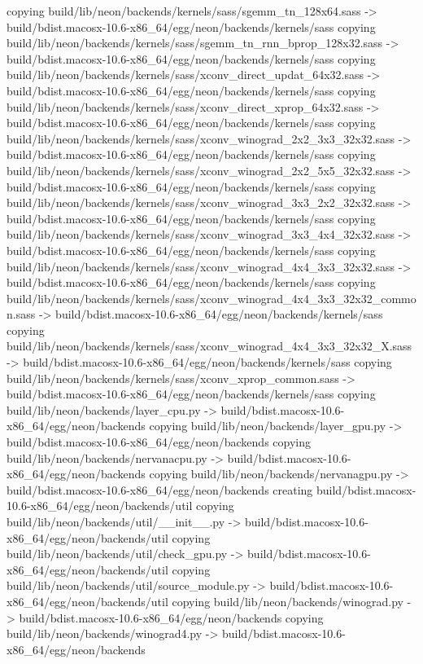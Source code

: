 copying build/lib/neon/backends/kernels/sass/sgemm_tn_128x64.sass -> build/bdist.macosx-10.6-x86_64/egg/neon/backends/kernels/sass
copying build/lib/neon/backends/kernels/sass/sgemm_tn_rnn_bprop_128x32.sass -> build/bdist.macosx-10.6-x86_64/egg/neon/backends/kernels/sass
copying build/lib/neon/backends/kernels/sass/xconv_direct_updat_64x32.sass -> build/bdist.macosx-10.6-x86_64/egg/neon/backends/kernels/sass
copying build/lib/neon/backends/kernels/sass/xconv_direct_xprop_64x32.sass -> build/bdist.macosx-10.6-x86_64/egg/neon/backends/kernels/sass
copying build/lib/neon/backends/kernels/sass/xconv_winograd_2x2_3x3_32x32.sass -> build/bdist.macosx-10.6-x86_64/egg/neon/backends/kernels/sass
copying build/lib/neon/backends/kernels/sass/xconv_winograd_2x2_5x5_32x32.sass -> build/bdist.macosx-10.6-x86_64/egg/neon/backends/kernels/sass
copying build/lib/neon/backends/kernels/sass/xconv_winograd_3x3_2x2_32x32.sass -> build/bdist.macosx-10.6-x86_64/egg/neon/backends/kernels/sass
copying build/lib/neon/backends/kernels/sass/xconv_winograd_3x3_4x4_32x32.sass -> build/bdist.macosx-10.6-x86_64/egg/neon/backends/kernels/sass
copying build/lib/neon/backends/kernels/sass/xconv_winograd_4x4_3x3_32x32.sass -> build/bdist.macosx-10.6-x86_64/egg/neon/backends/kernels/sass
copying build/lib/neon/backends/kernels/sass/xconv_winograd_4x4_3x3_32x32_common.sass -> build/bdist.macosx-10.6-x86_64/egg/neon/backends/kernels/sass
copying build/lib/neon/backends/kernels/sass/xconv_winograd_4x4_3x3_32x32_X.sass -> build/bdist.macosx-10.6-x86_64/egg/neon/backends/kernels/sass
copying build/lib/neon/backends/kernels/sass/xconv_xprop_common.sass -> build/bdist.macosx-10.6-x86_64/egg/neon/backends/kernels/sass
copying build/lib/neon/backends/layer_cpu.py -> build/bdist.macosx-10.6-x86_64/egg/neon/backends
copying build/lib/neon/backends/layer_gpu.py -> build/bdist.macosx-10.6-x86_64/egg/neon/backends
copying build/lib/neon/backends/nervanacpu.py -> build/bdist.macosx-10.6-x86_64/egg/neon/backends
copying build/lib/neon/backends/nervanagpu.py -> build/bdist.macosx-10.6-x86_64/egg/neon/backends
creating build/bdist.macosx-10.6-x86_64/egg/neon/backends/util
copying build/lib/neon/backends/util/__init__.py -> build/bdist.macosx-10.6-x86_64/egg/neon/backends/util
copying build/lib/neon/backends/util/check_gpu.py -> build/bdist.macosx-10.6-x86_64/egg/neon/backends/util
copying build/lib/neon/backends/util/source_module.py -> build/bdist.macosx-10.6-x86_64/egg/neon/backends/util
copying build/lib/neon/backends/winograd.py -> build/bdist.macosx-10.6-x86_64/egg/neon/backends
copying build/lib/neon/backends/winograd4.py -> build/bdist.macosx-10.6-x86_64/egg/neon/backends
